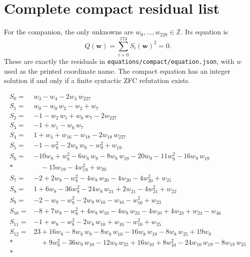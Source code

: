 \documentclass[11pt]{article}
\theoremstyle{remark}\newtheorem{remark}[theorem]{Remark}
\newcommand{\Z}{\mathbb Z}\newcommand{\N}{\mathbb N}
\newcommand{\CompactLastRow}{174}
\newcommand{\CompactLastVar}{228}
\begin{document}
\section{Complete compact residual list}\label{app:compact}

For the companion, the only unknowns are
$w_0,\ldots,w_{\CompactLastVar}\in\Z$. Its equation is
\[
 Q(\boldsymbol w)=\sum_{i=0}^{\CompactLastRow}S_i(\boldsymbol w)^2=0.
\]
These are exactly the residuals in
\nolinkurl{equations/compact/equation.json}, with $w$ used as the
printed coordinate name. The compact equation has an integer solution
if and only if a finite syntactic ZFC refutation exists.

\begingroup
\small
\setlength{\jot}{3pt}
\allowdisplaybreaks[4]
\begin{align*}
S_{0}={}& w_{3} - w_{4} - 2w_{4}\,w_{227} \\[2pt]
S_{1}={}& w_{0} - w_{0}\,w_{2} - w_{2} + w_{7} \\[2pt]
S_{2}={}& -1 - w_{2}\,w_{5} + w_{6}\,w_{7} - 2w_{227} \\[2pt]
S_{3}={}& -1 + w_{1} - w_{6}\,w_{7} \\[2pt]
S_{4}={}& 1 + w_{4} + w_{16} - w_{18} - 2w_{18}\,w_{227} \\[2pt]
S_{5}={}& -1 - w_{8}^{2} - 2w_{8}\,w_{9} - w_{9}^{2} + w_{19} \\[2pt]
S_{6}={}& -10w_{8} + w_{8}^{2} - 6w_{8}\,w_{9} - 8w_{8}\,w_{19} - 20w_{9} - 11w_{9}^{2} - 16w_{9}\,w_{19} \\*
&\quad  - 15w_{19} - 4w_{19}^{2} + w_{20} \\[2pt]
S_{7}={}& -2 + 2w_{8} - w_{8}^{2} - 4w_{8}\,w_{20} - 4w_{20} - 4w_{20}^{2} + w_{21} \\[2pt]
S_{8}={}& 1 + 6w_{8} - 36w_{8}^{2} - 24w_{8}\,w_{21} + 2w_{21} - 4w_{21}^{2} + w_{22} \\[2pt]
S_{9}={}& -2 - w_{9} - w_{9}^{2} - 2w_{9}\,w_{10} - w_{10} - w_{10}^{2} + w_{23} \\[2pt]
S_{10}={}& -8 + 7w_{8} - w_{8}^{2} + 4w_{8}\,w_{10} - 4w_{8}\,w_{23} - 4w_{10} + 4w_{23} + w_{24} - w_{46} \\[2pt]
S_{11}={}& -1 + w_{8} - w_{8}^{2} - 2w_{8}\,w_{10} + w_{10} - w_{10}^{2} + w_{25} \\[2pt]
S_{12}={}& 23 + 16w_{8} - 8w_{8}\,w_{9} - 8w_{8}\,w_{10} - 16w_{8}\,w_{19} - 8w_{8}\,w_{25} + 19w_{9} \\*
&\quad  + 9w_{9}^{2} - 36w_{9}\,w_{10} - 12w_{9}\,w_{25} + 16w_{10} + 8w_{10}^{2} - 24w_{10}\,w_{19} - 8w_{19}\,w_{25} \\*

\end{align*}
\end{document}
